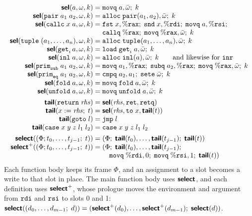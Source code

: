 \[
\begin{array}{@{}r@{\;}c@{\;}l@{}}
  \pass{sel}(a, \omega, k) & = & \kw{movq}\; a, \bar{\omega};\; k\\
  \pass{sel}(\kw{pair}\;a_1\;a_2, \omega, k) & = & \kw{alloc}\; \kw{pair}(a_1, a_2), \bar{\omega};\; k\\
  \pass{sel}(\kw{callc}\;x\;a, \omega, k) & = &
    \kw{fst}\; x, \%\kw{rax};\; \kw{snd}\; x, \%\kw{rdi};\; \kw{movq}\; a, \%\kw{rsi};\\
  & & \kw{callq}\; \%\kw{rax};\; \kw{movq}\; \%\kw{rax}, \bar{\omega};\; k\\
  \pass{sel}(\kw{tuple}\;(a_1, \ldots, a_n), \omega, k) & = & \kw{alloc}\; \kw{tuple}(a_1, \ldots, a_n), \bar{\omega};\; k\\
  \pass{sel}(\kw{get}_i\,a, \omega, k) & = & \kw{load}\; \kw{get}_i\; a, \bar{\omega};\; k\\
  \pass{sel}(\kw{inl}\;a, \omega, k) & = & \kw{alloc}\; \kw{inl}(a), \bar{\omega};\; k
    \qquad \text{and likewise for } \kw{inr}\\
  \pass{sel}(\kw{prim}_{\kw{sub}}\;a_1\;a_2, \omega, k) & = &
    \kw{movq}\; a_1, \%\kw{rax};\; \kw{subq}\; a_2, \%\kw{rax};\; \kw{movq}\; \%\kw{rax}, \bar{\omega};\; k\\
  \pass{sel}(\kw{prim}_{\kw{eq}}\;a_1\;a_2, \omega, k) & = & \kw{cmpq}\; a_2, a_1;\; \kw{sete}\; \bar{\omega};\; k\\
  \pass{sel}(\kw{fold}\;a, \omega, k) & = & \kw{movq}\; \kw{fold}\;a, \bar{\omega};\; k\\
  \pass{sel}(\kw{unfold}\;a, \omega, k) & = & \kw{movq}\; \kw{unfold}\;a, \bar{\omega};\; k\\[4pt]
  \pass{tail}(\kw{return}\;\rhs) & = & \pass{sel}(\rhs, \kw{ret}, \kw{retq})\\
  \pass{tail}(x \mathrel{:=} \rhs;\; t) & = & \pass{sel}(\rhs, \kw{to}\;x, \pass{tail}(t))\\
  \pass{tail}(\kw{goto}\;l) & = & \kw{jmp}\; l\\
  \pass{tail}(\kw{case}\;x\;y\;z\;l_1\;l_2) & = & \kw{case}\;x\;y\;z\;l_1\;l_2\\[4pt]
  \pass{select}((\Phi; t_0, \ldots, t_{j-1};\; t)) & = &
    (\Phi;\; \pass{tail}(t_0), \ldots, \pass{tail}(t_{j-1});\; \pass{tail}(t))\\
  \pass{select}^{+}((\Phi; t_0, \ldots, t_{j-1};\; t)) & = &
    (\Phi;\; \pass{tail}(t_0), \ldots, \pass{tail}(t_{j-1});\\
  & & \quad \kw{movq}\; \%\kw{rdi}, 0;\; \kw{movq}\; \%\kw{rsi}, 1;\; \pass{tail}(t))
\end{array}
\]
Each function body keeps its frame $\Phi$, and an assignment to a slot
becomes a write to that slot in place. The main function body uses $\textsf{\bfseries select}$, and
each definition uses $\textsf{\bfseries select}^{+}$, whose prologue moves the
environment and argument from $\mathtt{rdi}$ and $\mathtt{rsi}$ to slots 0 and
1: $\textsf{\bfseries select}((d_0, \ldots, d_{m-1};\; d)) =
(\textsf{\bfseries select}^{+}(d_0), \ldots, \textsf{\bfseries select}^{+}(d_{m-1});\;
\textsf{\bfseries select}(d))$.

